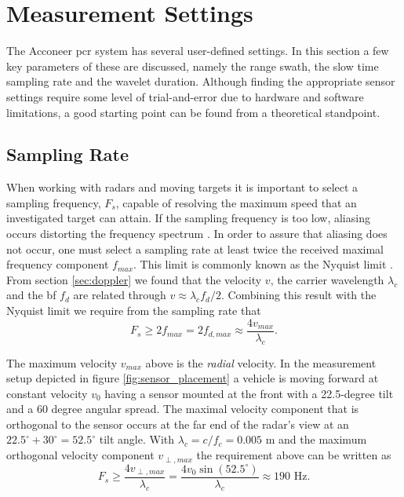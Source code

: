 \section{Measurement Settings}

The Acconeer \gls{pcr} system has several user-defined settings. In this section a few key parameters of these are discussed, namely the range swath, the slow time sampling rate and the wavelet duration. Although finding the appropriate sensor settings require some level of trial-and-error due to hardware and software limitations, a good starting point can be found from a theoretical standpoint. 

\subsection{Sampling Rate}\label{sec:srate}
When working with radars and moving targets it is important to select a sampling frequency, $F_s$, capable of resolving the maximum speed that an investigated target can attain. If the sampling frequency is too low, aliasing occurs distorting the frequency spectrum \citep{lindgren_rootzezn_sandsten_2014}. In order to assure that aliasing does not occur, one must select a sampling rate at least twice the received maximal frequency component $f_{max}$. This limit is commonly known as the Nyquist limit \citep{proakis_manolakis_1995}. From section \ref{sec:doppler} we found that the velocity $v$, the carrier wavelength $\lambda_c$ and the \gls{bf} $f_d$ are related through $v \approx \lambda_cf_d/2$. Combining this result with the Nyquist limit we require from the sampling rate that
\begin{equation}
	\label{eq:nyquist}
		F_{s} \geq 2f_{max} 
		= 2f_{d,max} 
		\approx \frac{4v_{max}}{\lambda_c}.
\end{equation}

The maximum velocity $v_{max}$ above is the \emph{radial} velocity. In the measurement setup depicted in figure \ref{fig:sensor_placement} a vehicle is moving forward at constant velocity $v_0$ having a sensor mounted at the front with a 22.5-degree tilt and a 60 degree angular spread. The maximal velocity component that is orthogonal to the sensor occurs at the far end of the radar's view at an $22.5^\circ + 30^\circ = 52.5^\circ$ tilt angle. With $\lambda_c=c/f_c=0.005$ m and the maximum orthogonal velocity component $v_{\perp, max}$ the requirement above can be written as
\begin{equation}
	F_s \geq 
	\frac{4v_{\perp, max}}{\lambda_c}
	= \frac{4v_0\sin(52.5^\circ)}{\lambda_c} 
	\approx 190 \text{ Hz}.
\end{equation}

